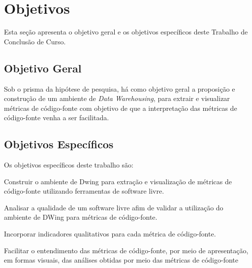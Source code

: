 





\section{Objetivos}

Esta seção apresenta o objetivo geral e os objetivos específicos deste Trabalho de Conclusão de Curso.

\subsection{Objetivo Geral}
Sob o prisma da hipótese de pesquisa, há como objetivo geral a proposição e 
construção de um ambiente de \textit{Data Warehousing}, para extrair e visualizar métricas de código-fonte com objetivo de que a interpretação das métricas de código-fonte venha a ser facilitada.


\subsection{Objetivos Específicos}

Os objetivos específicos deste trabalho são:


\begin{objectives}
	\item Construir o ambiente de Dwing para extração e visualização de 
	métricas de código-fonte utilizando ferramentas de software livre. 

	\item Analisar a qualidade de um software livre afim de validar a utilização do ambiente de DWing para métricas de código-fonte.
  
	\item Incorporar indicadores qualitativos para cada métrica de código-fonte.
	
	\item Facilitar o entendimento das métricas de código-fonte, por meio de 
	apresentação, em formas visuais, das análises obtidas por meio das métricas de código-fonte
	
    \end{objectives}
	


